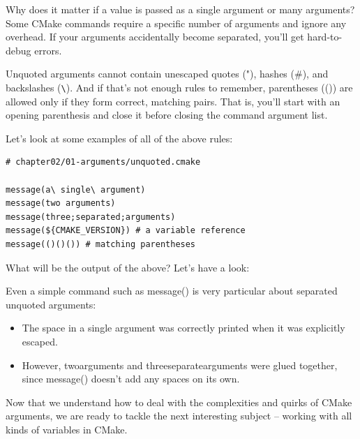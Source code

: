 \begin{tcolorbox}[colback=black!5!white,colframe=black!75!black,title=Question]
Why does it matter if a value is passed as a single argument or many arguments? Some CMake commands require a specific number of arguments and ignore any overhead. If your arguments accidentally become separated, you'll get hard-to-debug errors.
\end{tcolorbox}

Unquoted arguments cannot contain unescaped quotes ("), hashes (\#), and backslashes (\verb|\|). And if that's not enough rules to remember, parentheses (()) are allowed only if they form correct, matching pairs. That is, you'll start with an opening parenthesis and close it before closing the command argument list.

Let's look at some examples of all of the above rules:

\begin{lstlisting}[style=styleCMake]
# chapter02/01-arguments/unquoted.cmake
	
message(a\ single\ argument)
message(two arguments)
message(three;separated;arguments)
message(${CMAKE_VERSION}) # a variable reference
message(()()()) # matching parentheses
\end{lstlisting}

What will be the output of the above? Let's have a look:


Even a simple command such as message() is very particular about separated unquoted arguments:

\begin{itemize}
\item 
The space in a single argument was correctly printed when it was explicitly escaped.

\item 
However, twoarguments and threeseparatearguments were glued together, since message() doesn't add any spaces on its own.
\end{itemize}

Now that we understand how to deal with the complexities and quirks of CMake arguments, we are ready to tackle the next interesting subject – working with all kinds of variables in CMake.









